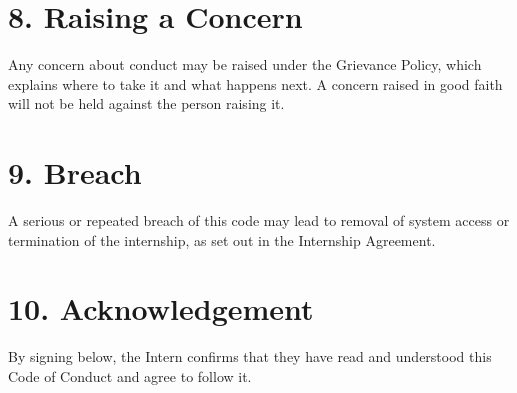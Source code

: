 \documentclass{paridyum}
\begin{document}
\section*{8. Raising a Concern}
Any concern about conduct may be raised under the Grievance Policy, which
explains where to take it and what happens next. A concern raised in good faith
will not be held against the person raising it.

\section*{9. Breach}
A serious or repeated breach of this code may lead to removal of system access
or termination of the internship, as set out in the Internship Agreement.

\section*{10. Acknowledgement}
By signing below, the Intern confirms that they have read and understood this
Code of Conduct and agree to follow it.

\vspace{1.5em}
\paridyumsignblock

\vspace{1.5em}
\end{document}

